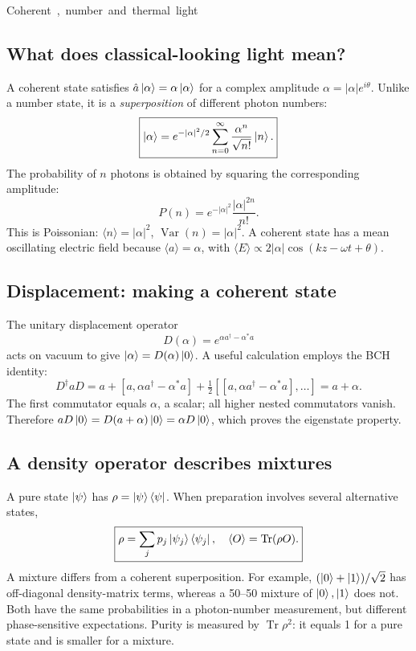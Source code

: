 \unit{Coherent, number and thermal light}
\subsection{What does classical-looking light mean?}
A coherent state satisfies \(\hat a\left\lvert \alpha\right\rangle=\alpha\left\lvert \alpha\right\rangle\)
for a complex amplitude \(\alpha=|\alpha|e^{i\theta}\).
Unlike a number state, it is a \emph{superposition}
of different photon numbers:
\[
\boxed{\left\lvert \alpha\right\rangle=e^{-|\alpha|^2/2}
\sum_{n=0}^\infty\frac{\alpha^n}{\sqrt{n!}}\left\lvert n\right\rangle.}
\]
The probability of \(n\) photons is obtained by
squaring the corresponding amplitude:
\[
P(n)=e^{-|\alpha|^2}\frac{|\alpha|^{2n}}{n!}.
\]
This is Poissonian: \(\langle n\rangle=|\alpha|^2\),
\(\operatorname{Var}(n)=|\alpha|^2\).
A coherent state has a mean oscillating electric
field because \(\langle a\rangle=\alpha\), with
\(\langle E\rangle\propto2|\alpha|\cos(kz-\omega t+\theta)\).

\subsection{Displacement: making a coherent state}
The unitary displacement operator
\[
D(\alpha)=e^{\alpha a^\dagger-\alpha^*a}
\]
acts on vacuum to give \(\left\lvert \alpha\right\rangle=D(\alpha)\left\lvert 0\right\rangle\).
A useful calculation employs the BCH identity:
\[
D^\dagger aD=a+[a,\alpha a^\dagger-\alpha^*a]
+\tfrac12[[a,\alpha a^\dagger-\alpha^*a],\ldots]
=\boxed{a+\alpha}.
\]
The first commutator equals \(\alpha\), a scalar;
all higher nested commutators vanish. Therefore
\(aD\left\lvert 0\right\rangle=D(a+\alpha)\left\lvert 0\right\rangle=\alpha D\left\lvert 0\right\rangle\),
which proves the eigenstate property.

\subsection{A density operator describes mixtures}
A pure state \(\left\lvert \psi\right\rangle\) has \(\rho=\left\lvert \psi\right\rangle\left\langle \psi\right\rvert\).
When preparation involves several alternative states,
\[
\boxed{\rho=\sum_jp_j\left\lvert \psi_j\right\rangle\left\langle \psi_j\right\rvert,
\quad \langle O\rangle=\operatorname{Tr}(\rho O).}
\]
A mixture differs from a coherent superposition.
For example,
\((\left\lvert 0\right\rangle+\left\lvert 1\right\rangle)/\sqrt2\) has off-diagonal
density-matrix terms, whereas a 50--50 mixture
of \(\left\lvert 0\right\rangle,\left\lvert 1\right\rangle\) does not. Both have the
same probabilities in a photon-number measurement,
but different phase-sensitive expectations.
Purity is measured by \(\operatorname{Tr}\rho^2\):
it equals 1 for a pure state and is smaller for a mixture.

